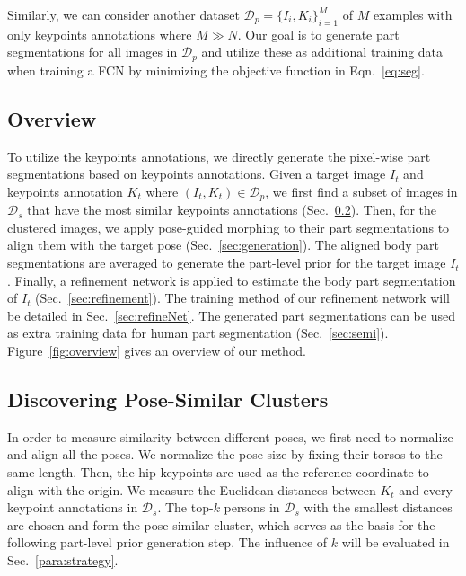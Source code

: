 \documentclass[10pt,twocolumn,letterpaper]{article}
\begin{document}
Similarly, we can consider another dataset ${\mathcal{D}_{p} = \{I_{i}, K_{i}\}_{i=1}^{M}}$ of $M$ examples with only keypoints annotations where $M \gg N$. Our goal is to generate part segmentations for all images in $\mathcal{D}_{p}$ and utilize these as additional training data when training a FCN by minimizing the objective function in Eqn.~\ref{eq:seg}.

\subsection{Overview}
To utilize the keypoints annotations, we directly generate the pixel-wise part segmentations based on keypoints annotations. Given a target image $I_{t}$ and keypoints annotation $K_{t}$ where $(I_{t}, K_{t}) \in \mathcal{D}_{p}$, we first find a subset of images in $\mathcal{D}_{s}$ that have the most similar keypoints annotations (Sec.~\ref{sec:cluster}). Then, for the clustered images, we apply pose-guided morphing to their part segmentations to align them with the target pose (Sec.~\ref{sec:generation}). The aligned body part segmentations are averaged to generate the part-level prior for the target image $I_{t}$. Finally, a refinement network is applied to estimate the body part segmentation of $I_{t}$ (Sec.~\ref{sec:refinement}). The training method of our refinement network will be detailed in Sec.~\ref{sec:refineNet}. The generated part segmentations can be used as extra training data for human part segmentation (Sec.~\ref{sec:semi}).  Figure~\ref{fig:overview} gives an overview of our method.

\subsection{Discovering Pose-Similar Clusters}
\label{sec:cluster}
In order to measure similarity between different poses, we first need to normalize and align all the poses. We normalize the pose size by fixing their torsos to the same length. Then, the hip keypoints are used as the reference coordinate to align with the origin. We measure the Euclidean distances between $K_{t}$ and every keypoint annotations in $\mathcal{D}_{s}$. The top-$k$ persons in $\mathcal{D}_{s}$ with the smallest distances are chosen and form the pose-similar cluster, which serves as the basis for the following part-level prior generation step. The influence of $k$ will be evaluated in Sec.~\ref{para:strategy}.
\end{document}

